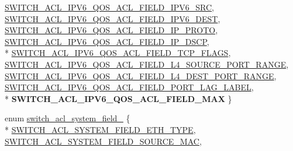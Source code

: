 \begin{DoxyCompactItemize}
\hyperlink{group__ACL_gga3a2cce0ed542240f953c53cbd4b1fc47a24418c6ada51fe3b9dbea2469f6386a7}{S\+W\+I\+T\+C\+H\+\_\+\+A\+C\+L\+\_\+\+I\+P\+V6\+\_\+\+Q\+O\+S\+\_\+\+A\+C\+L\+\_\+\+F\+I\+E\+L\+D\+\_\+\+I\+P\+V6\+\_\+\+S\+R\+C}, 
\hyperlink{group__ACL_gga3a2cce0ed542240f953c53cbd4b1fc47aa40d23f5ed571fe7bba56687bf0a43a5}{S\+W\+I\+T\+C\+H\+\_\+\+A\+C\+L\+\_\+\+I\+P\+V6\+\_\+\+Q\+O\+S\+\_\+\+A\+C\+L\+\_\+\+F\+I\+E\+L\+D\+\_\+\+I\+P\+V6\+\_\+\+D\+E\+S\+T}, 
\hyperlink{group__ACL_gga3a2cce0ed542240f953c53cbd4b1fc47a86352989734f9efd1475f559284890fb}{S\+W\+I\+T\+C\+H\+\_\+\+A\+C\+L\+\_\+\+I\+P\+V6\+\_\+\+Q\+O\+S\+\_\+\+A\+C\+L\+\_\+\+F\+I\+E\+L\+D\+\_\+\+I\+P\+\_\+\+P\+R\+O\+T\+O}, 
\hyperlink{group__ACL_gga3a2cce0ed542240f953c53cbd4b1fc47ac6b10b4524dd6a9c08274cebdc4695cb}{S\+W\+I\+T\+C\+H\+\_\+\+A\+C\+L\+\_\+\+I\+P\+V6\+\_\+\+Q\+O\+S\+\_\+\+A\+C\+L\+\_\+\+F\+I\+E\+L\+D\+\_\+\+I\+P\+\_\+\+D\+S\+C\+P}, 
\\*
\hyperlink{group__ACL_gga3a2cce0ed542240f953c53cbd4b1fc47ac30211553599110c3f3edaf04013f2f1}{S\+W\+I\+T\+C\+H\+\_\+\+A\+C\+L\+\_\+\+I\+P\+V6\+\_\+\+Q\+O\+S\+\_\+\+A\+C\+L\+\_\+\+F\+I\+E\+L\+D\+\_\+\+T\+C\+P\+\_\+\+F\+L\+A\+G\+S}, 
\hyperlink{group__ACL_gga3a2cce0ed542240f953c53cbd4b1fc47ab5d624d5245cea61e4927ca4b56ebb93}{S\+W\+I\+T\+C\+H\+\_\+\+A\+C\+L\+\_\+\+I\+P\+V6\+\_\+\+Q\+O\+S\+\_\+\+A\+C\+L\+\_\+\+F\+I\+E\+L\+D\+\_\+\+L4\+\_\+\+S\+O\+U\+R\+C\+E\+\_\+\+P\+O\+R\+T\+\_\+\+R\+A\+N\+G\+E}, 
\hyperlink{group__ACL_gga3a2cce0ed542240f953c53cbd4b1fc47aaa2fce785aeed83a27edc0f2f99777dd}{S\+W\+I\+T\+C\+H\+\_\+\+A\+C\+L\+\_\+\+I\+P\+V6\+\_\+\+Q\+O\+S\+\_\+\+A\+C\+L\+\_\+\+F\+I\+E\+L\+D\+\_\+\+L4\+\_\+\+D\+E\+S\+T\+\_\+\+P\+O\+R\+T\+\_\+\+R\+A\+N\+G\+E}, 
\hyperlink{group__ACL_gga3a2cce0ed542240f953c53cbd4b1fc47a0e48e868e6c9163dbde777fd16cedb26}{S\+W\+I\+T\+C\+H\+\_\+\+A\+C\+L\+\_\+\+I\+P\+V6\+\_\+\+Q\+O\+S\+\_\+\+A\+C\+L\+\_\+\+F\+I\+E\+L\+D\+\_\+\+P\+O\+R\+T\+\_\+\+L\+A\+G\+\_\+\+L\+A\+B\+E\+L}, 
\\*
{\bfseries S\+W\+I\+T\+C\+H\+\_\+\+A\+C\+L\+\_\+\+I\+P\+V6\+\_\+\+Q\+O\+S\+\_\+\+A\+C\+L\+\_\+\+F\+I\+E\+L\+D\+\_\+\+M\+A\+X}
 \}
\item 
enum \hyperlink{group__ACL_ga620cb3ced31cc813578d68b496991f0e}{switch\+\_\+acl\+\_\+system\+\_\+field\+\_\+} \{ \\*
\hyperlink{group__ACL_gga620cb3ced31cc813578d68b496991f0ea3fbf03456c03e28e360e9cac20fcaa78}{S\+W\+I\+T\+C\+H\+\_\+\+A\+C\+L\+\_\+\+S\+Y\+S\+T\+E\+M\+\_\+\+F\+I\+E\+L\+D\+\_\+\+E\+T\+H\+\_\+\+T\+Y\+P\+E}, 
\hyperlink{group__ACL_gga620cb3ced31cc813578d68b496991f0ea51354192340a9dd8a78f5a0f65b0b44d}{S\+W\+I\+T\+C\+H\+\_\+\+A\+C\+L\+\_\+\+S\+Y\+S\+T\+E\+M\+\_\+\+F\+I\+E\+L\+D\+\_\+\+S\+O\+U\+R\+C\+E\+\_\+\+M\+A\+C}, 

\end{DoxyCompactItemize}
